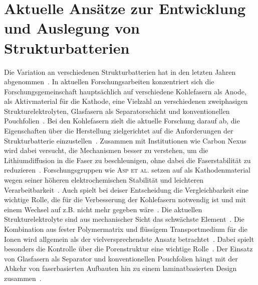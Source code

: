 \section{Aktuelle Ansätze zur Entwicklung und Auslegung von Strukturbatterien}
Die Variation an verschiedenen Strukturbatterien hat in den letzten Jahren abgenommen~\cite{Asp2024}. In aktuellen Forschungsarbeiten konzentriert sich die Forschungsgemeinschaft hauptsächlich auf verschiedene Kohlefasern als Anode,  als Aktivmaterial für die Kathode, eine Vielzahl an verschiedenen zweiphasigen Strukturelektrolyten, Glasfasern als Separatorschicht und konventionellen Pouchfolien~\cite{Asp2021,Jin2023, Asp2024,Chaudhary2024}. Bei den Kohlefasern zielt die aktuelle Forschung darauf ab, die Eigenschaften über die Herstellung zielgerichtet auf die Anforderungen der Strukturbatterie einzustellen~\cite{Asp2024}. Zusammen mit Institutionen wie Carbon Nexus wird dabei versucht, die Mechanismen besser zu verstehen, um die Lithiumdiffusion in die Faser zu beschleunigen, ohne dabei die Faserstabilität zu reduzieren~\cite{Duan2021,Larsson2023,Johansen2024,Asp2024}. Forschungsgruppen wie \textsc{Asp et al.} setzen auf  als Kathodenmaterial wegen seiner höheren elektrochemischen Stabilität und leichteren Verarbeitbarkeit~\cite{Asp2021, Siraj2023, Ye2024, Chaudhary2024}. Auch spielt bei deiser Entscheidung die Vergleichbarkeit eine wichtige Rolle, die für die Verbesserung der Kohlefasern notwendig ist und mit einem Wechsel auf z.B.  nicht mehr gegeben wäre~\cite{Asp2024}. Die aktuellen Strukturelektrolyte sind aus mechanischer Sicht das schwächste Element~\cite{Lee2019,Jin2023}. Die Kombination aus fester Polymermatrix und flüssigem Transportmedium für die Ionen wird allgemein als der vielversprechendste Ansatz betrachtet~\cite{Lee2019,Asp2021, Greenhalgh2023}. Dabei spielt besonders die Kontrolle über die Porenstruktur eine wichtige Rolle~\cite{Lee2019}. Der Einsatz von Glasfasern als Separator und konventionellen Pouchfolien hängt mit der Abkehr von faserbasierten Aufbauten hin zu einem laminatbasierten Design zusammen~\cite{Zhao2020,Xu2022}.

